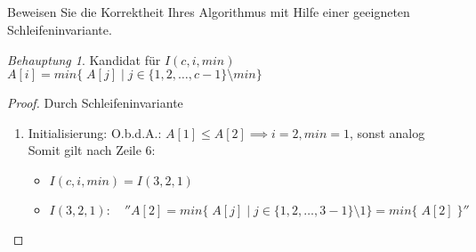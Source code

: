 \documentclass[12pt]{article}
\theoremstyle{remark}
\newtheorem*{Behauptung}{Behauptung}
\begin{document}
\subsection{} Beweisen Sie die Korrektheit Ihres Algorithmus mit Hilfe einer geeigneten Schleifeninvariante.

\begin{Behauptung}

Kandidat für $I(c,i,min)$ \\
$A[i] = min\{\; A[j] \;| \; j \in \{1,2, \ldots, c - 1\}\setminus min\}$
\end{Behauptung}

\begin{proof}
Durch Schleifeninvariante
\begin{enumerate}
    \item Initialisierung:
    O.b.d.A.: $A[1] \leq A[2] \implies i=2, min = 1$, sonst analog\\
    Somit gilt nach Zeile 6:
    \begin{itemize}
        \item $I(c, i, min) = I(3, 2, 1)$
        \item $I(3,2,1): \quad ''A[2] = min\{\; A[j] \;| \; j \in \{1,2, \ldots, 3 - 1\}\setminus 1\}=min\{\; A[2] \;\}''$
    \end{itemize}


\end{enumerate}
\end{proof}
\end{document}
